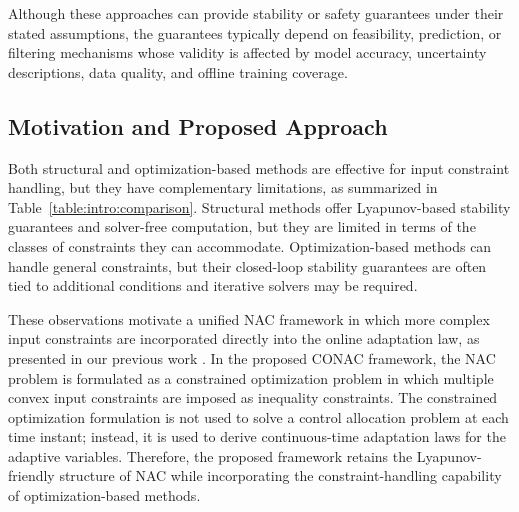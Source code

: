 \documentclass[letterpaper, journal, twoside]{IEEEtran}
\begin{document}
Although these approaches can provide stability or safety guarantees under their stated assumptions, the guarantees typically depend on feasibility, prediction, or filtering mechanisms whose validity is affected by model accuracy, uncertainty descriptions, data quality, and offline training coverage.


\subsection{Motivation and Proposed Approach}

Both structural and optimization-based methods are effective for input constraint handling, but they have complementary limitations, as summarized in Table~\ref{table:intro:comparison}.
Structural methods offer Lyapunov-based stability guarantees and solver-free computation, but they are limited in terms of the classes of constraints they can accommodate.
Optimization-based methods can handle general constraints, but their closed-loop stability guarantees are often tied to additional conditions and iterative solvers may be required.

These observations motivate a unified NAC framework in which more complex input constraints are incorporated directly into the online adaptation law, as presented in our previous work \cite{Ryu:2025aa}.
In the proposed CONAC framework, the NAC problem is formulated as a constrained optimization problem in which multiple convex input constraints are imposed as inequality constraints.
The constrained optimization formulation is not used to solve a control allocation problem at each time instant; instead, it is used to derive continuous-time adaptation laws for the adaptive variables.
Therefore, the proposed framework retains the Lyapunov-friendly structure of NAC while incorporating the constraint-handling capability of optimization-based methods.
\end{document}

